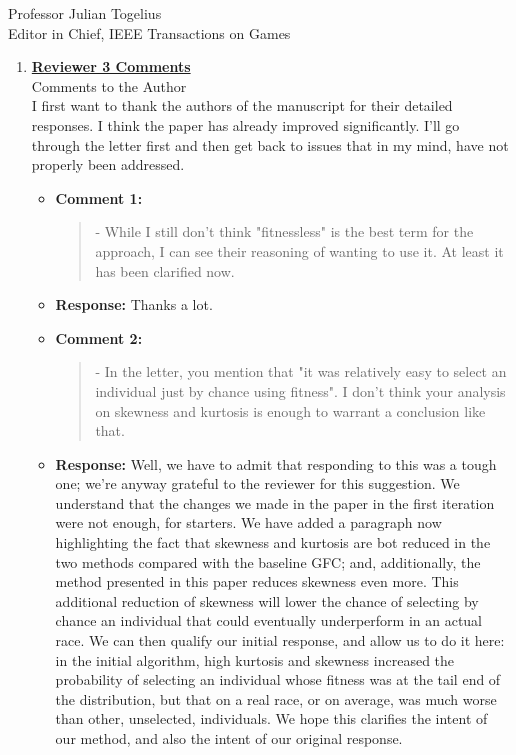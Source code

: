 \documentclass[10pt]{letter} %
\begin{document}
\begin{letter}{Professor Julian Togelius \\ Editor in Chief, IEEE Transactions on Games}
\begin{enumerate}
\newpage

%
\item {\bf \underline{ Reviewer 3 Comments}}\\
		Comments to the Author\\
		I first want to thank the authors of the manuscript for their detailed responses. I think the paper has already improved significantly. I'll go through the letter first and then get back to issues that in my mind, have not properly been addressed.	
		\begin{itemize}
			\item {\bf Comment 1:}
				\begin{quote}	
					- While I still don't think "fitnessless" is the best term for the approach, I can see their reasoning of wanting to use it. At least it has been clarified now.
				\end{quote}	
			\item {\bf Response:} 
                          Thanks a lot.
			\item {\bf Comment 2:}
				\begin{quote}	
					- In the letter, you mention that "it was relatively easy to select an individual just by chance using fitness". I don't think your analysis on skewness and kurtosis is enough to warrant a conclusion like that.
				\end{quote}	
			\item {\bf Response:} 
Well, we have to admit that responding to this was a tough one; we're
anyway grateful to the reviewer for this suggestion. We understand
that the changes we made in the paper in the first iteration were not
enough, for starters. We have added a paragraph now highlighting the
fact that skewness and kurtosis are bot reduced in the two methods
compared with the baseline  {\sf GFC}; and, additionally, the method
presented in this paper reduces skewness even more. This additional
reduction of skewness will lower the chance of selecting by chance an
individual that could eventually underperform in an actual race. We
can then qualify our initial response, and allow us to do it here: in
the initial algorithm, high kurtosis and skewness increased the
probability of selecting an individual whose fitness was at the tail
end of the distribution, but that on a real race, or on average, was
much worse than other, unselected, individuals. We hope this clarifies
the intent of our method, and also the intent of our original response.

\end{itemize}
\end{enumerate}
\end{letter}
\end{document}
